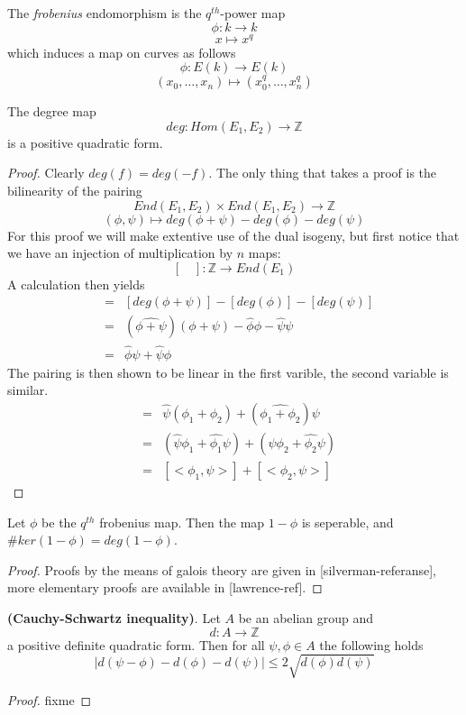 \documentclass[a4paper,10pt]{amsart}
\begin{document}
\begin{mydef}
 The \emph{frobenius} endomorphism is the $q^{th}$-power map
$$ \phi: k \rightarrow k $$
$$ x \mapsto x^q $$
which induces a map on curves as follows
$$ \phi: E(k) \rightarrow E(k) $$
$$ (x_0,\ldots , x_n) \mapsto (x_0^q, \ldots , x_n^q) $$
\end{mydef}

\begin{prop}
 The degree map
$$ deg: Hom(E_1, E_2) \rightarrow \mathbb{Z} $$
is a positive quadratic form.
\end{prop}
\begin{proof}
 Clearly $deg(f) = deg(-f)$. The only thing that takes a proof is the
bilinearity of the pairing
$$ End(E_1, E_2) \times End(E_1, E_2) \rightarrow \mathbb{Z}$$
$$ (\phi, \psi) \mapsto deg(\phi + \psi) - deg(\phi) - deg(\psi) $$
For this proof we will make extentive use of the dual isogeny, but first
notice that we have an injection of multiplication by $n$ maps:
$$ [\quad]: \mathbb{Z} \rightarrow End(E_1) $$
A calculation then yields 
\begin{eqnarray*} 
 [<\phi,\psi>] &=& [deg(\phi+\psi)]-[deg(\phi)]-[deg(\psi)] \nonumber \\
               &=& (\hat{\phi+\psi})(\phi+\psi) - \hat{\phi}\phi - \hat{\psi}\psi \nonumber \\
	       &=& \hat{\phi}\psi + \hat{\psi}\phi
\end{eqnarray*}
The pairing is then shown to be linear in the first varible, the second variable is
similar.
\begin{eqnarray*}
 [<\phi_1+\phi_2, \psi>] &=& \hat{\psi}(\phi_1+\phi_2) + (\hat{\phi_1+\phi_2})\psi \nonumber \\
			 &=& (\hat{\psi}\phi_1+\hat{\phi_1}\psi) + (\hat{\psi}\phi_2 + \hat{\phi_2}\psi) \nonumber \\
			 &=& [<\phi_1,\psi>] + [<\phi_2,\psi>] 
\end{eqnarray*}
\end{proof}

\begin{thm}
 Let $\phi$ be the $q^{th}$ frobenius map. Then the map $1-\phi$ is seperable, and
$\#ker(1-\phi) = deg(1-\phi)$.
\end{thm}
\begin{proof}
 Proofs by the means of galois theory are given in [silverman-referanse], more
elementary proofs are available in [lawrence-ref].
\end{proof}

\begin{lemma}
 \textbf{(Cauchy-Schwartz inequality)}. Let $A$ be an abelian group and
$$ d: A \rightarrow \mathbb{Z} $$
a positive definite quadratic form. Then for all $\psi, \phi \in A$ the following holds
$$ |d(\psi-\phi)-d(\phi)-d(\psi)| \leq 2 \sqrt{d(\phi)d(\psi)} $$
\end{lemma}
\begin{proof}
 fixme
\end{proof}
\end{document}
